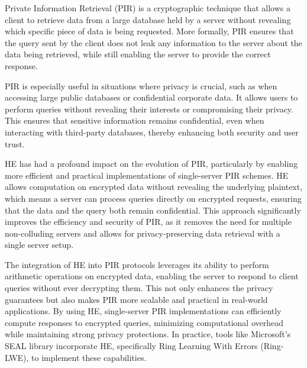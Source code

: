 \documentclass[
  letterpaper,
  DIV=11,
  numbers=noendperiod,
  oneside]{scrartcl}
\begin{document}
Private Information Retrieval (PIR) is a cryptographic technique that
allows a client to retrieve data from a large database held by a server
without revealing which specific piece of data is being requested. More
formally, PIR ensures that the query sent by the client does not leak
any information to the server about the data being retrieved, while
still enabling the server to provide the correct response.

PIR is especially useful in situations where privacy is crucial, such as
when accessing large public databases or confidential corporate data. It
allows users to perform queries without revealing their interests or
compromising their privacy. This ensures that sensitive information
remains confidential, even when interacting with third-party databases,
thereby enhancing both security and user trust.

HE has had a profound impact on the evolution of PIR, particularly by
enabling more efficient and practical implementations of single-server
PIR schemes. HE allows computation on encrypted data without revealing
the underlying plaintext, which means a server can process queries
directly on encrypted requests, ensuring that the data and the query
both remain confidential. This approach significantly improves the
efficiency and security of PIR, as it removes the need for multiple
non-colluding servers and allows for privacy-preserving data retrieval
with a single server setup.

The integration of HE into PIR protocols leverages its ability to
perform arithmetic operations on encrypted data, enabling the server to
respond to client queries without ever decrypting them. This not only
enhances the privacy guarantees but also makes PIR more scalable and
practical in real-world applications. By using HE, single-server PIR
implementations can efficiently compute responses to encrypted queries,
minimizing computational overhead while maintaining strong privacy
protections. In practice, tools like Microsoft's SEAL library
incorporate HE, specifically Ring Learning With Errors (Ring-LWE), to
implement these capabilities.
\end{document}
